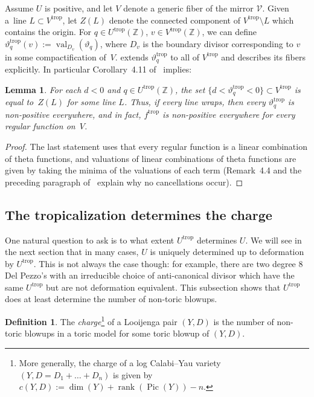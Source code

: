 \documentclass[11pt]{article}
\numberwithin{equation}{section}
\numberwithin{figure}{section}
\numberwithin{table}{section}
\DeclareMathOperator{\Pic}{Pic}
\DeclareMathOperator{\rank}{rank}
\DeclareMathOperator{\val}{val}
\DeclareMathOperator{\trop}{trop}
\let\bb=\mathbb
\let\s=\mathcal
\newtheorem{lem}[thm]{Lemma}
\theoremstyle{definition}
\newtheorem{dfn}[thm]{Definition}
\begin{document}
Assume $U$ is positive, and let $V$ denote a generic fiber of the mirror $\s{V}$. Given a~line \mbox{$L\subset V^{\trop}$}, let $Z(L)$ denote the connected component of $V^{\trop}\setminus L$ which contains the origin. For $q\in U^{\trop}(\bb{Z})$, $v\in V^{\trop}(\bb{Z})$, we can define $\vartheta_q^{\trop}(v):=\val_{D_v}(\vartheta_q)$, where $D_v$ is the boundary divisor corresponding to $v$ in some compactification of~$V$. \cite{Man1} extends $\vartheta_q^{\trop}$ to all of $V^{\trop}$ and describes its fibers explicitly. In particular Corollary~4.11 of~\cite{Man1} implies:
\begin{lem}\label{NegativeFibers}
For each $d<0$ and $q\in U^{\trop}(\bb{Z})$, the set $\big\{d<\vartheta_q^{\trop}<0\big\}\subset V^{\trop}$ is equal to~$Z(L)$ for some line $L$. Thus, if every line wraps, then every $\vartheta_q^{\trop}$ is non-positive everywhere, and in fact, $f^{\trop}$ is non-positive everywhere for every regular function on~$V$.
\end{lem}
\begin{proof}
The last statement uses that every regular function is a linear combination of theta functions, and valuations of linear combinations of theta functions are given by taking the minima of the valuations of each term (Remark~4.4 and the preceding paragraph of~\cite{Man1} explain why no cancellations occur).
\end{proof}

\subsection{The tropicalization determines the charge}\label{trop-charge}

One natural question to ask is to what extent $U^{\trop}$ determines $U$. We will see in the next section that in many cases, $U$ is uniquely determined up to deformation by $U^{\trop}$. This is not always the case though: for example, there are two degree $8$ Del Pezzo's with an irreducible choice of anti-canonical divisor which have the same $U^{\trop}$ but are not deformation equivalent. This subsection shows that $U^{\trop}$ does at least determine the number of non-toric blowups.

\begin{dfn}The {\it charge}\footnote{More generally, the charge of a log Calabi--Yau variety $(Y,D=D_1+\dots+D_n)$ is given by $c(Y,D):=\dim(Y)+\rank(\Pic(Y))-n$.} of a Looijenga pair $(Y,D)$ is the number of non-toric blowups in a toric model for some toric blowup of $(Y,D)$.
\end{dfn}
\end{document}
